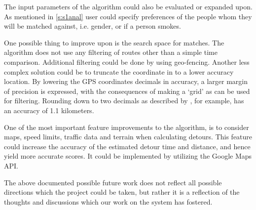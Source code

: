 The input parameters of the algorithm could also be evaluated or expanded upon.
As mentioned in \ref{s:s1anal} user could specify preferences of the people whom they will be matched against, i.e. gender, or if a person smokes.

One possible thing to improve upon is the search space for matches.
The algorithm does not use any filtering of routes other than a simple time comparison.
Additional filtering could be done by using geo-fencing.
Another less complex solution could be to truncate the coordinate in to a lower accuracy location.
By lowering the GPS coordinates decimals in accuracy, a larger margin of precision is expressed, with the consequences of making a `grid' as can be used for filtering.
Rounding down to two decimals as described by \citet{gpsdecimal}, for example, has an accuracy of 1.1 kilometers.

One of the most important feature improvements to the algorithm, is to consider maps, speed limits, traffic data and terrain when calculating detours.
This feature could increase the accuracy of the estimated detour time and distance, and hence yield more accurate scores.
It could be implemented by utilizing the Google Maps API.

The above documented possible future work does not reflect all possible directions which the project could be taken, but rather it is a reflection of the thoughts and discussions which our work on the system has fostered.